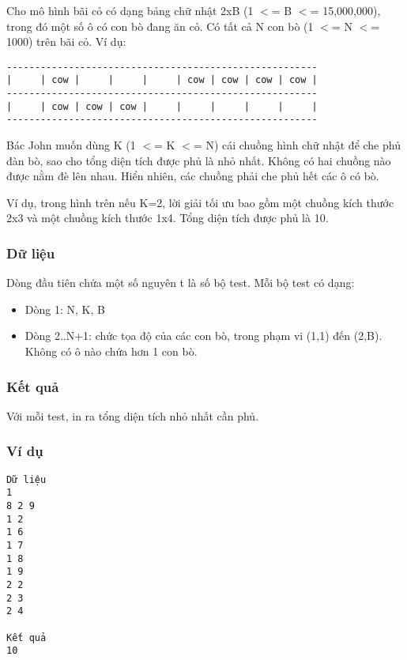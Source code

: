 



   Cho mô hình bãi cỏ có dạng bảng chữ nhật 2xB (1 $<$= B $<$= 15,000,000), trong đó một số ô có con bò đang ăn cỏ. Có tất cả N con bò (1 $<$= N $<$= 1000) trên bãi cỏ. Ví dụ:  
\begin{verbatim}
-------------------------------------------------------
|     | cow |     |     |     | cow | cow | cow | cow |
-------------------------------------------------------
|     | cow | cow | cow |     |     |     |     |     |
-------------------------------------------------------
\end{verbatim}

   Bác John muốn dùng K (1 $<$= K $<$= N) cái chuồng hình chữ nhật để che phủ đàn bò, sao cho tổng diện tích được phủ là nhỏ nhất. Không có hai chuồng nào được nằm đè lên nhau. Hiển nhiên, các chuồng phải che phủ hết các ô có bò.  

   Ví dụ, trong hình trên nếu K=2, lời giải tối ưu bao gồm một chuồng kích thước 2x3 và một chuồng kích thước 1x4. Tổng diện tích được phủ là 10.  

\subsubsection{   Dữ liệu  }

   Dòng đầu tiên chứa một số nguyên t là số bộ test. Mỗi bộ test có dạng:  
\begin{itemize}
	\item     Dòng 1: N, K, B   
	\item     Dòng 2..N+1: chức tọa độ của các con bò, trong phạm vi (1,1) đến (2,B). Không có ô nào chứa hơn 1 con bò.   
\end{itemize}

\subsubsection{   Kết quả  }

   Với mỗi test, in ra tổng diện tích nhỏ nhất cần phủ.  

\subsubsection{   Ví dụ  }
\begin{verbatim}
Dữ liệu
1
8 2 9
1 2
1 6
1 7
1 8
1 9
2 2
2 3
2 4

Kết quả
10
\end{verbatim}